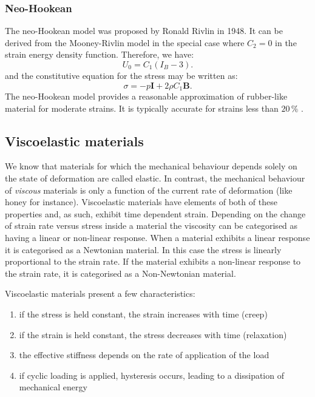 	\subsubsection*{Neo-Hookean}			
The neo-Hookean model was proposed by Ronald Rivlin in 1948. It can be derived from the Mooney-Rivlin model in the special case where $C_2 = 0$ in the strain energy density function. Therefore, we have:
\begin{equation}
U_0 = C_1 (I_B-3).
\end{equation}
and the constitutive equation for the stress may be written as:
\begin{equation}
\sigma = -p \mathbf{I} + 2 \rho C_1 \mathbf{B}.
\end{equation}
The neo-Hookean model provides a reasonable approximation of rubber-like material for moderate strains.  It is typically accurate for strains less than $20\, \%$ \citep{Gent01}.
			
			
	\subsection{Viscoelastic materials}
\ON We know that materials for which the mechanical behaviour depends solely on the state of deformation are called elastic. In contrast, the mechanical behaviour of \emph{viscous} materials is only a function of the current rate of deformation (like honey for instance). \OFF Viscoelastic materials have elements of both of these properties and, as such, exhibit time dependent strain. Depending on the change of strain rate versus stress inside a material the viscosity can be categorised as having a linear or non-linear response. When a material exhibits a linear response it is categorised as a Newtonian material. In this case the stress is linearly proportional to the strain rate. If the material exhibits a non-linear response to the strain rate, it is categorised as a Non-Newtonian material. 

Viscoelastic materials present a few characteristics: 
\begin{enumerate}
\item if the stress is held constant, the strain increases with time (creep)
\item if the strain is held constant, the stress decreases with time (relaxation)
\item the effective stiffness depends on the rate of application of the load
\item if cyclic loading is applied, hysteresis occurs, leading to a dissipation of mechanical energy
\end{enumerate}

